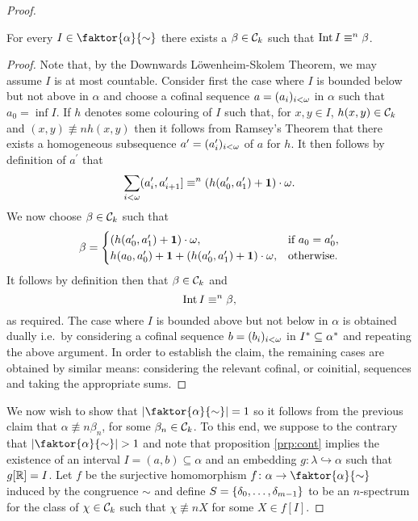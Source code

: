 \begin{proof}
	\begin{claim}\label{clm:contInt}
		For every $I\in\faktor{\alpha}{\sim}$ there exists a $\beta\in\mathcal{C}_k$ such that $\operatorname{Int} I\equiv^{n}\beta$.
	\end{claim}
	\begin{proof}
		Note that, by the Downwards L\"owenheim-Skolem Theorem, we may assume $I$ is at most countable.  Consider first the case where $I$ is bounded below but not above in $\alpha$ and choose a cofinal sequence $a=(a_i)_{i<\omega}$ in $\alpha$ such that $a_0=\inf I$.  If $h$ denotes some colouring of $I$ such that, for $x,y\in I$, $h(x,y)\in\mathcal{C}_k$ and $(x,y)\nequiv{n}h(x,y)$ then it follows from Ramsey's Theorem that there exists a homogeneous subsequence $a^\prime=(a^\prime_i)_{i<\omega}$ of $a$ for $h$.  It then follows by definition of $a^\prime$ that
		\begin{equation}
			\sum_{i<\omega}(a^\prime_i,a^\prime_{i+1}]\equiv^{n}\left(h(a^\prime_0,a^\prime_1)+\mathbf{1}\right)\cdot\omega.
		\end{equation}
		We now choose $\beta\in\mathcal{C}_k$ such that
		\begin{equation}
			\beta=\begin{cases}
				\left(h(a^\prime_0,a^\prime_1)+\mathbf{1}\right)\cdot\omega,&\text{if }a_0=a^\prime_0,\\
				h(a_0,a^\prime_0)+\mathbf{1}+\left(h(a^\prime_0,a^\prime_1)+\mathbf{1}\right)\cdot\omega,& \text{otherwise}.\\
			\end{cases}
		\end{equation}
		It follows by definition then that $\beta\in\mathcal{C}_k$ and
		\begin{equation}
			\operatorname{Int} I\equiv^{n}\beta,
		\end{equation}
		as required.  The case where $I$ is bounded above but not below in $\alpha$ is obtained dually i.e.\ by considering a cofinal sequence $b=(b_i)_{i<\omega}$ in ${I}^\ast\subseteq{\alpha}^\ast$ and repeating the above argument.  In order to establish the claim, the remaining cases are obtained by similar means: considering the relevant cofinal, or coinitial, sequences and taking the appropriate sums.
	\end{proof}

	We now wish to show that $\card{\faktor{\alpha}{\sim}}=1$ so it follows from the previous claim that $\alpha\nequiv{n}\beta_n$, for some $\beta_n\in\mathcal{C}_k$.  To this end, we suppose to the contrary that $\card{\faktor{\alpha}{\sim}}>1$ and note that proposition \ref{prp:cont} implies the existence of an interval $I=(a,b)\subseteq\alpha$ and an embedding $g\colon\lambda\hookrightarrow\alpha$ such that $g[\mathbb{R}]=I$.  Let $f$ be the surjective homomorphism $f\colon\alpha\to\faktor{\alpha}{\sim}$ induced by the congruence $\sim$ and define $S=\left\lbrace \delta_0,\dotsc,\delta_{m-1}\right\rbrace$ to be an $n$-spectrum for the class of $\chi\in\mathcal{C}_k$ such that $\chi\nequiv{n}X$ for some $X\in f[I]$.


\end{proof}
